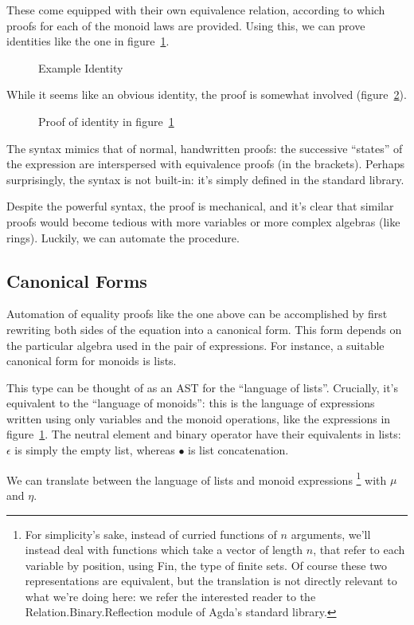 \documentclass[draft, twocolumn]{article}
\begin{document}
These come equipped with their own equivalence relation, according to which
proofs for each of the monoid laws are provided. Using this, we can prove
identities like the one in figure~\ref{mon-ident}.
\begin{figure}[h]
  \caption{Example Identity}
  \label{mon-ident}
\end{figure}

While it seems like an obvious identity, the proof is somewhat involved
(figure~\ref{mon-proof}).
\begin{figure}[!h]
  \caption{Proof of identity in figure~\ref{mon-ident}}
  \label{mon-proof}
\end{figure}

The syntax mimics that of normal, handwritten proofs: the successive ``states''
of the expression are interspersed with equivalence proofs (in the brackets).
Perhaps surprisingly, the syntax is not built-in: it's simply defined in the
standard library.

Despite the powerful syntax, the proof is mechanical, and it's clear that
similar proofs would become tedious with more variables or more complex algebras
(like rings). Luckily, we can automate the procedure.
\subsection{Canonical Forms}
Automation of equality proofs like the one above can be accomplished by first
rewriting both sides of the equation into a canonical form. This form depends on
the particular algebra used in the pair of expressions. For instance, a suitable
canonical form for monoids is lists.

This type can be thought of as an AST for the ``language of lists''. Crucially,
it's equivalent to the ``language of monoids'': this is the language of
expressions written using only variables and the monoid operations, like the
expressions in figure~\ref{mon-ident}. The neutral element and binary operator
have their equivalents in lists: \(\epsilon\) is simply the empty list, whereas
\(\bullet\) is list concatenation.

We can translate between the language of lists and monoid expressions
\footnote{
  For simplicity's sake, instead of curried functions of \(n\)
  arguments, we'll instead deal with functions which take a vector of length
  \(n\), that refer to each variable by position, using Fin, the type of finite
  sets. Of course these two representations are equivalent, but the translation
  is not directly relevant to what we're doing here: we refer the interested
  reader to the Relation.Binary.Reflection module of Agda's standard
  library\cite{danielsson_agda_2018}.
}
with \(\mu\) and \(\eta\).
\end{document}
